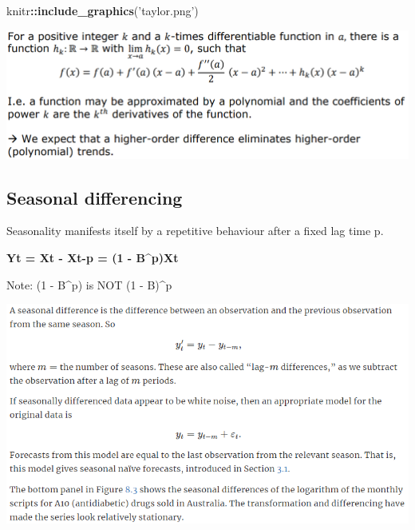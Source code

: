 \documentclass[
]{article}
\newenvironment{Shaded}{\begin{snugshade}}{\end{snugshade}}
\newcommand{\KeywordTok}[1]{\textcolor[rgb]{0.13,0.29,0.53}{\textbf{#1}}}
\newcommand{\NormalTok}[1]{#1}
\newcommand{\OperatorTok}[1]{\textcolor[rgb]{0.81,0.36,0.00}{\textbf{#1}}}
\newcommand{\StringTok}[1]{\textcolor[rgb]{0.31,0.60,0.02}{#1}}
\begin{document}
\begin{Shaded}
\begin{Highlighting}[]
\NormalTok{knitr}\OperatorTok{::}\KeywordTok{include_graphics}\NormalTok{(}\StringTok{'taylor.png'}\NormalTok{)}
\end{Highlighting}
\end{Shaded}

\includegraphics[width=14.04in]{taylor}

\hypertarget{seasonal-differencing}{%
\subsection{Seasonal differencing}\label{seasonal-differencing}}

Seasonality manifests itself by a repetitive behaviour after a fixed lag
time p.

\textbf{Yt = Xt - Xt-p = (1 - B\^{}p)Xt}

Note: (1 - B\^{}p) is NOT (1 - B)\^{}p

\includegraphics[width=1\linewidth]{deason_diff}
\end{document}
